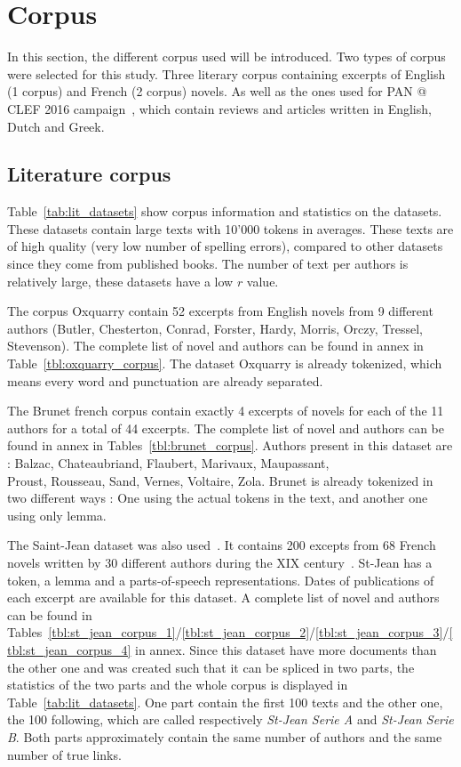 \section{Corpus \label{sec:corpus}}

In this section, the different corpus used will be introduced.
Two types of corpus were selected for this study.
Three literary corpus containing excerpts of English (1 corpus) and French (2 corpus) novels.
As well as the ones used for PAN @ CLEF 2016 campaign~\cite{pan16}, which contain reviews and articles written in English, Dutch and Greek.

\subsection{Literature corpus}
\label{sec:lit_corpus}

Table~\ref{tab:lit_datasets} show corpus information and statistics on the datasets.
These datasets contain large texts with 10'000 tokens in averages.
These texts are of high quality (very low number of spelling errors), compared to other datasets since they come from published books.
The number of text per authors is relatively large, these datasets have a low $r$ value.

The corpus Oxquarry contain 52 excerpts from English novels from 9 different authors (Butler, Chesterton, Conrad, Forster, Hardy, Morris, Orczy, Tressel, Stevenson).
The complete list of novel and authors can be found in annex in Table~\ref{tbl:oxquarry_corpus}.
The dataset Oxquarry is already tokenized, which means every word and punctuation are already separated.

The Brunet french corpus contain exactly 4 excerpts of novels for each of the 11 authors for a total of 44 excerpts.
The complete list of novel and authors can be found in annex in Tables~\ref{tbl:brunet_corpus}.
Authors present in this dataset are : Balzac, Chateaubriand, Flaubert, Marivaux, Maupassant, \\
Proust, Rousseau, Sand, Vernes, Voltaire, Zola.
Brunet is already tokenized in two different ways : One using the actual tokens in the text, and another one using only lemma.

The Saint-Jean dataset was also used~\cite{unine_corpus}.
It contains 200 excepts from 68 French novels written by 30 different authors during the XIX century~\cite{st_jean}.
St-Jean has a token, a lemma and a parts-of-speech representations.
Dates of publications of each excerpt are available for this dataset.
A complete list of novel and authors can be found in Tables~\ref{tbl:st_jean_corpus_1}/\ref{tbl:st_jean_corpus_2}/\ref{tbl:st_jean_corpus_3}/\ref{tbl:st_jean_corpus_4} in annex.
Since this dataset have more documents than the other one and was created such that it can be spliced in two parts, the statistics of the two parts and the whole corpus is displayed in Table~\ref{tab:lit_datasets}.
One part contain the first 100 texts and the other one, the 100 following, which are called respectively \textit{St-Jean Serie A} and \textit{St-Jean Serie B}.
Both parts approximately contain the same number of authors and the same number of true links.


